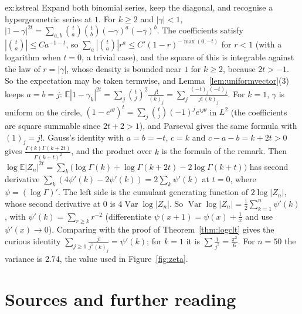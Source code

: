 \begin{solution}{ex:kstreal}
\idea Expand both binomial series, keep the diagonal, and recognise a hypergeometric series at $1$.
\writeup For $k\ge2$ and $|\gamma|<1$, $|1-\gamma|^{2t}=\sum_{a,b}\binom ta\binom tb(-\gamma)^a(-\bar\gamma)^b$. The coefficients satisfy $|\binom ta|\le Ca^{-1-t}$, so $\sum_a|\binom ta|r^a\le C'(1-r)^{-\max(0,-t)}$ for $r<1$ (with a logarithm when $t=0$, a trivial case),
and the square of this is integrable against the law of $r=|\gamma|$, whose density is bounded near $1$ for $k\ge2$, because $2t>-1$. So the expectation may be taken termwise, and Lemma~\ref{lem:uniformvector}(3) keeps $a=b=j$:
$\mathbb E|1-\gamma_k|^{2t}=\sum_j\binom tj^2\frac{j!}{(k)_j}=\sum_j\frac{(-t)_j(-t)_j}{j!\,(k)_j}$. For $k=1$, $\gamma$ is uniform on the circle, $(1-e^{i\theta})^t=\sum_j\binom tj(-1)^je^{ij\theta}$ in $L^2$ (the coefficients are square summable since $2t+2>1$), and
Parseval gives the same formula with $(1)_j=j!$. Gauss's identity with $a=b=-t$, $c=k$ and $c-a-b=k+2t>0$ gives $\frac{\Gamma(k)\Gamma(k+2t)}{\Gamma(k+t)^2}$, and the product over $k$ is the formula of the remark. Then
$\log\mathbb E|Z_n|^{2t}=\sum_k\bigl(\log\Gamma(k)+\log\Gamma(k+2t)-2\log\Gamma(k+t)\bigr)$ has second derivative $\sum_k(4\psi'(k)-2\psi'(k))=2\sum_k\psi'(k)$ at $t=0$, where $\psi=(\log\Gamma)'$. The left side is the cumulant generating function of
$2\log|Z_n|$, whose second derivative at $0$ is $4\operatorname{Var}\log|Z_n|$. So $\operatorname{Var}\log|Z_n|=\frac12\sum_{k=1}^n\psi'(k)$, with $\psi'(k)=\sum_{r\ge k}r^{-2}$ (differentiate $\psi(x+1)=\psi(x)+\frac1x$ and use $\psi'(x)\to0$). Comparing with the proof
of Theorem~\ref{thm:logclt} gives the curious identity $\sum_{j\ge1}\frac{j!}{j^2(k)_j}=\psi'(k)$; for $k=1$ it is $\sum\frac1{j^2}=\frac{\pi^2}6$. For $n=50$ the variance is $2.74$, the value used in Figure~\ref{fig:zeta}.
\end{solution}

\section*{Sources and further reading}

